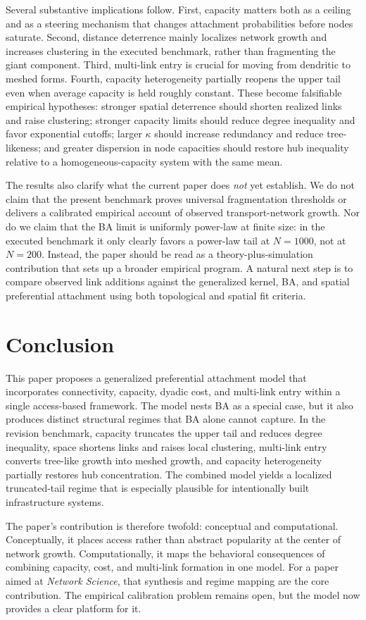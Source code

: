 \documentclass[11pt]{article}
\begin{document}
Several substantive implications follow. First, capacity matters both as a ceiling and as a steering mechanism that changes attachment probabilities before nodes saturate. Second, distance deterrence mainly localizes network growth and increases clustering in the executed benchmark, rather than fragmenting the giant component. Third, multi-link entry is crucial for moving from dendritic to meshed forms. Fourth, capacity heterogeneity partially reopens the upper tail even when average capacity is held roughly constant. These become falsifiable empirical hypotheses: stronger spatial deterrence should shorten realized links and raise clustering; stronger capacity limits should reduce degree inequality and favor exponential cutoffs; larger $\kappa$ should increase redundancy and reduce tree-likeness; and greater dispersion in node capacities should restore hub inequality relative to a homogeneous-capacity system with the same mean.

The results also clarify what the current paper does \emph{not} yet establish. We do not claim that the present benchmark proves universal fragmentation thresholds or delivers a calibrated empirical account of observed transport-network growth. Nor do we claim that the BA limit is uniformly power-law at finite size: in the executed benchmark it only clearly favors a power-law tail at $N=1000$, not at $N=200$. Instead, the paper should be read as a theory-plus-simulation contribution that sets up a broader empirical program. A natural next step is to compare observed link additions against the generalized kernel, BA, and spatial preferential attachment using both topological and spatial fit criteria.

\section{Conclusion}

This paper proposes a generalized preferential attachment model that incorporates connectivity, capacity, dyadic cost, and multi-link entry within a single access-based framework. The model nests BA as a special case, but it also produces distinct structural regimes that BA alone cannot capture. In the revision benchmark, capacity truncates the upper tail and reduces degree inequality, space shortens links and raises local clustering, multi-link entry converts tree-like growth into meshed growth, and capacity heterogeneity partially restores hub concentration. The combined model yields a localized truncated-tail regime that is especially plausible for intentionally built infrastructure systems.

The paper's contribution is therefore twofold: conceptual and computational. Conceptually, it places access rather than abstract popularity at the center of network growth. Computationally, it maps the behavioral consequences of combining capacity, cost, and multi-link formation in one model. For a paper aimed at \emph{Network Science}, that synthesis and regime mapping are the core contribution. The empirical calibration problem remains open, but the model now provides a clear platform for it.



\end{document}
